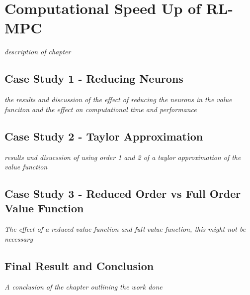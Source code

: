 \chapter{Computational Speed Up of RL-MPC}

\emph{description of chapter}

\section{Case Study 1 - Reducing Neurons}
\emph{the results and discussion of the effect of reducing the neurons in the value funciton and the effect on computational time and performance}

\section{Case Study 2 - Taylor Approximation}
\emph{results and disucssion of using order 1 and 2 of a taylor approximation of the value function}

\section{Case Study 3 - Reduced Order vs Full Order Value Function}
\emph{The effect of a reduced value function and full value function, this might not be necessary}

\section{Final Result and Conclusion}

\emph{A conclusion of the chapter outlining the work done}